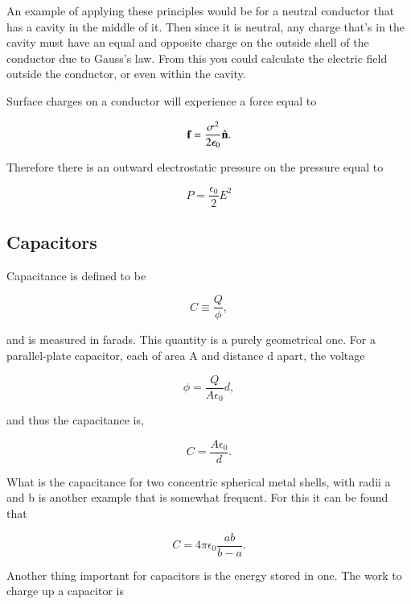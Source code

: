 \documentclass[preprint, review,12pt]{elsarticle}
\def\b{\textbf}
\def\={\equiv}
\newcommand{\hb}[1]{\hat{\b #1}}
\begin{document}
An example of applying these principles would be for a neutral conductor that has a cavity in the middle of it. Then since it is neutral, any charge that's in the cavity must have an equal and opposite charge on the outside shell of the conductor due to Gauss's law. From this you could calculate the electric field outside the conductor, or even within the cavity.

Surface charges on a conductor will experience a force equal to 

\begin{equation}
    \b{f} = \frac{\sigma^2}{2 \epsilon_0} \hb{n}.
\end{equation}

Therefore there is an outward electrostatic pressure on the pressure equal to

\begin{equation}
    P = \frac{\epsilon_0}{2}E^2
\end{equation}

\subsection{Capacitors}

Capacitance is defined to be

\begin{equation}
    C \= \frac{Q}{\phi},
\end{equation}

and is measured in farads. This quantity is a purely geometrical one. For a parallel-plate capacitor, each of area A and distance d apart, the voltage

\begin{equation}
    \phi = \frac{Q}{A\epsilon_0}d,
\end{equation}

and thus the capacitance is,

\begin{equation}
    C = \frac{A\epsilon_0}{d}.
\end{equation}

What is the capacitance for two concentric spherical metal shells, with radii a and b is another example that is somewhat frequent. For this it can be found that

\begin{equation}
    C = 4\pi \epsilon_0 \frac{ab}{b-a}.
\end{equation}

Another thing important for capacitors is the energy stored in one. The work to charge up a capacitor is
\end{document}
